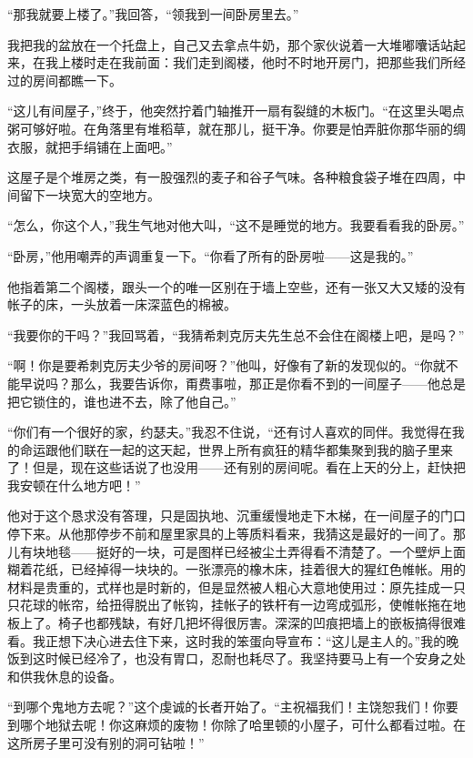 {    \par “那我就要上楼了。”我回答，“领我到一间卧房里去。”
    \par 我把我的盆放在一个托盘上，自己又去拿点牛奶，那个家伙说着一大堆嘟囔话站起来，在我上楼时走在我前面：我们走到阁楼，他时不时地开房门，把那些我们所经过的房间都瞧一下。
    \par “这儿有间屋子，”终于，他突然拧着门轴推开一扇有裂缝的木板门。“在这里头喝点粥可够好啦。在角落里有堆稻草，就在那儿，挺干净。你要是怕弄脏你那华丽的绸衣服，就把手绢铺在上面吧。”
    \par 这屋子是个堆房之类，有一股强烈的麦子和谷子气味。各种粮食袋子堆在四周，中间留下一块宽大的空地方。
    \par “怎么，你这个人，”我生气地对他大叫，“这不是睡觉的地方。我要看看我的卧房。”
    \par “卧房，”他用嘲弄的声调重复一下。“你看了所有的卧房啦——这是我的。”
    \par 他指着第二个阁楼，跟头一个的唯一区别在于墙上空些，还有一张又大又矮的没有帐子的床，一头放着一床深蓝色的棉被。
    \par “我要你的干吗？”我回骂着，“我猜希刺克厉夫先生总不会住在阁楼上吧，是吗？”
    \par “啊！你是要希刺克厉夫少爷的房间呀？”他叫，好像有了新的发现似的。“你就不能早说吗？那么，我要告诉你，甭费事啦，那正是你看不到的一间屋子——他总是把它锁住的，谁也进不去，除了他自己。”
    \par “你们有一个很好的家，约瑟夫。”我忍不住说，“还有讨人喜欢的同伴。我觉得在我的命运跟他们联在一起的这天起，世界上所有疯狂的精华都集聚到我的脑子里来了！但是，现在这些话说了也没用——还有别的房间呢。看在上天的分上，赶快把我安顿在什么地方吧！”
    \par 他对于这个恳求没有答理，只是固执地、沉重缓慢地走下木梯，在一间屋子的门口停下来。从他那停步不前和屋里家具的上等质料看来，我猜这是最好的一间了。那儿有块地毯——挺好的一块，可是图样已经被尘土弄得看不清楚了。一个壁炉上面糊着花纸，已经掉得一块块的。一张漂亮的橡木床，挂着很大的猩红色帷帐。用的材料是贵重的，式样也是时新的，但是显然被人粗心大意地使用过：原先挂成一只只花球的帐帘，给扭得脱出了帐钩，挂帐子的铁杆有一边弯成弧形，使帷帐拖在地板上了。椅子也都残缺，有好几把坏得很厉害。深深的凹痕把墙上的嵌板搞得很难看。我正想下决心进去住下来，这时我的笨蛋向导宣布：“这儿是主人的。”我的晚饭到这时候已经冷了，也没有胃口，忍耐也耗尽了。我坚持要马上有一个安身之处和供我休息的设备。
    \par “到哪个鬼地方去呢？”这个虔诚的长者开始了。“主祝福我们！主饶恕我们！你要到哪个地狱去呢！你这麻烦的废物！你除了哈里顿的小屋子，可什么都看过啦。在这所房子里可没有别的洞可钻啦！”
}
